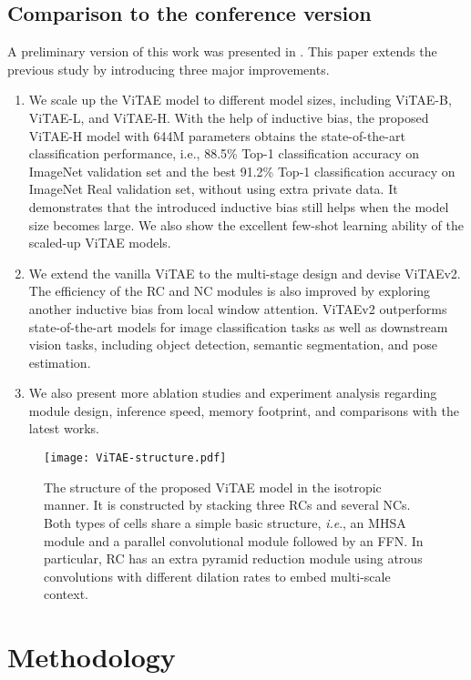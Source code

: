 \documentclass[twocolumn]{svjour3}          \smartqed  \usepackage{natbib}
\newcommand{\ie}{i.e}
\def\onedot{.\xspace}
\def\ie{\emph{i.e}\onedot}
\begin{document}
\subsection{Comparison to the conference version}
A preliminary version of this work was presented in \citep{xu2021vitae}. This paper extends the previous study by introducing three major improvements.

\begin{enumerate}
    \item We scale up the ViTAE model to different model sizes, including ViTAE-B, ViTAE-L, and ViTAE-H. With the help of inductive bias, the proposed ViTAE-H model with 644M parameters obtains the state-of-the-art classification performance, i.e., 88.5\% Top-1 classification accuracy on ImageNet validation set and the best 91.2\% Top-1 classification accuracy on ImageNet Real validation set, without using extra private data. It demonstrates that the introduced inductive bias still helps when the model size becomes large. We also show the excellent few-shot learning ability of the scaled-up ViTAE models.
    \item We extend the vanilla ViTAE to the multi-stage design and devise ViTAEv2. The efficiency of the RC and NC modules is also improved by exploring another inductive bias from local window attention. ViTAEv2 outperforms state-of-the-art models for image classification tasks as well as downstream vision tasks, including object detection, semantic segmentation, and pose estimation.
    \item We also present more ablation studies and experiment analysis regarding module design, inference speed, memory footprint, and comparisons with the latest works.
    
\end{enumerate}

\begin{figure*}[ht]
    \centering
    \texttt{[image: ViTAE-structure.pdf]}
    \caption{The structure of the proposed ViTAE model in the isotropic manner. It is constructed by stacking three RCs and several NCs. Both types of cells share a simple basic structure, \ie, an MHSA module and a parallel convolutional module followed by an FFN. In particular, RC has an extra pyramid reduction module using atrous convolutions with different dilation rates to embed multi-scale context.}
    \label{fig:structure}
\end{figure*}

\section{Methodology}
\end{document}
